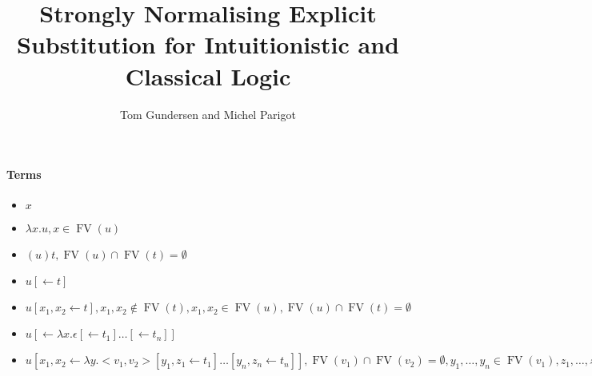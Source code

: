\documentclass[a4paper]{article}
\begin{document}
\title{Strongly Normalising Explicit Substitution for Intuitionistic and Classical Logic}

\author{Tom Gundersen and Michel Parigot}

\maketitle
% 
% 
% 

\newcommand{\FV}{\mathop{FV}}

\paragraph{Terms}
\begin{itemize}
 \item $x$
 \item $\lambda x.u, x\in\FV(u)$
 \item $(u)t, \FV(u)\cap\FV(t)=\emptyset$
 \item $u[\leftarrow t]$
 \item $u[x_1,x_2\leftarrow t], x_1,x_2\not\in\FV(t), x_1,x_2\in\FV(u), \FV(u)\cap\FV(t)=\emptyset$
 \item $u[\leftarrow \lambda x.\epsilon[\leftarrow t_1]\dots[\leftarrow t_n]]$
 \item $u[x_1,x_2\leftarrow \lambda y.<v_1,v_2>[y_1,z_1\leftarrow t_1]\dots[y_n,z_n\leftarrow t_n]], \FV(v_1)\cap\FV(v_2)=\emptyset, y_1,\dots,y_n\in\FV(v_1),z_1,\dots,z_n\in\FV(v_2)$
\end{itemize}
\end{document}
